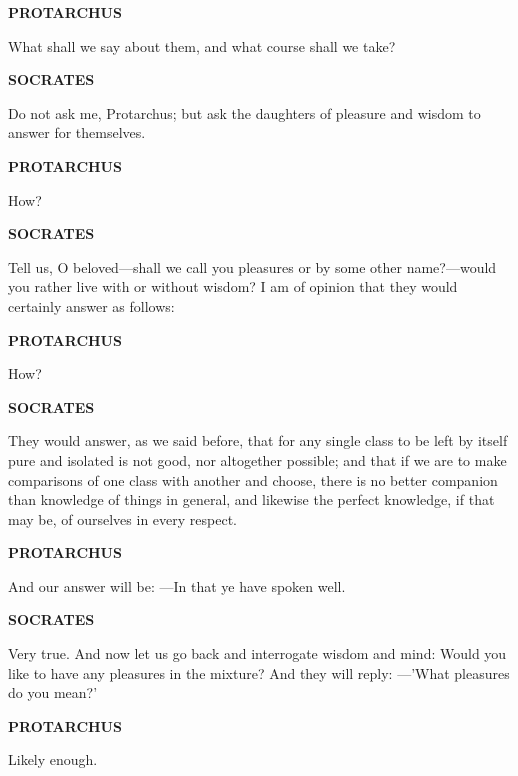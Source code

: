 \documentclass[11pt,letter]{article}
\begin{document}
\par \textbf{PROTARCHUS}
\par   What shall we say about them, and what course shall we take?

\par \textbf{SOCRATES}
\par   Do not ask me, Protarchus; but ask the daughters of pleasure and wisdom to answer for themselves.

\par \textbf{PROTARCHUS}
\par   How?

\par \textbf{SOCRATES}
\par   Tell us, O beloved—shall we call you pleasures or by some other name?—would you rather live with or without wisdom? I am of opinion that they would certainly answer as follows:

\par \textbf{PROTARCHUS}
\par   How?

\par \textbf{SOCRATES}
\par   They would answer, as we said before, that for any single class to be left by itself pure and isolated is not good, nor altogether possible; and that if we are to make comparisons of one class with another and choose, there is no better companion than knowledge of things in general, and likewise the perfect knowledge, if that may be, of ourselves in every respect.

\par \textbf{PROTARCHUS}
\par   And our answer will be: —In that ye have spoken well.

\par \textbf{SOCRATES}
\par   Very true. And now let us go back and interrogate wisdom and mind:  Would you like to have any pleasures in the mixture? And they will reply: —'What pleasures do you mean?'

\par \textbf{PROTARCHUS}
\par   Likely enough.
\end{document}
